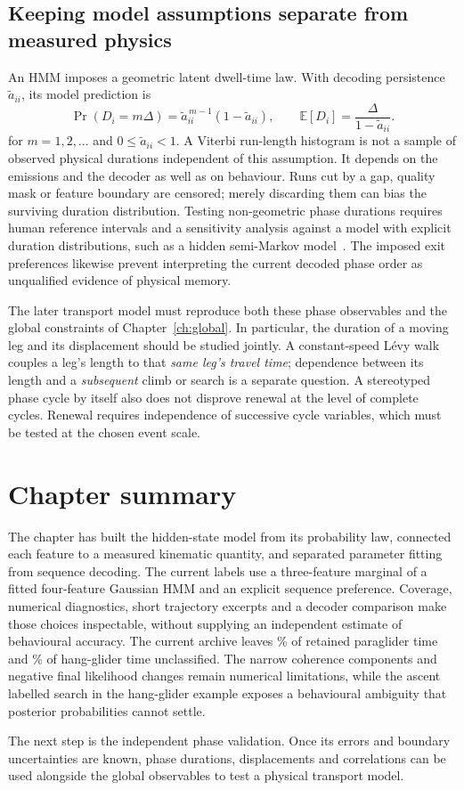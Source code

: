 \subsection{Keeping model assumptions separate from measured physics}
\label{sec:modelling}
An HMM imposes a geometric latent dwell-time law. With decoding persistence
$\widetilde a_{ii}$, its model prediction is
\begin{equation}
 \Pr(D_i=m\Delta)=\widetilde a_{ii}^{\,m-1}(1-\widetilde a_{ii}),\qquad
 \mathbb E[D_i]=\frac{\Delta}{1-\widetilde a_{ii}}.
 \label{eq:hmmsojourn}
\end{equation}
for $m=1,2,\ldots$ and $0\le\widetilde a_{ii}<1$.
A Viterbi run-length histogram is not a sample of observed physical durations independent
of this assumption. It depends on the emissions and the decoder as well as on behaviour.
Runs cut by a gap, quality mask or feature boundary are censored; merely discarding them
can bias the surviving duration distribution. Testing non-geometric phase durations
requires human reference intervals and a sensitivity analysis against a model with
explicit duration distributions, such as a hidden semi-Markov model~\cite{langrock2012}.
The imposed exit preferences likewise prevent interpreting the current decoded phase
order as unqualified evidence of physical memory.

The later transport model must reproduce both these phase observables and the global
constraints of Chapter~\ref{ch:global}. In particular, the duration of a moving leg and
its displacement should be studied jointly. A constant-speed L\'evy walk couples a leg's
length to that \emph{same leg's travel time}; dependence between its length and a
\emph{subsequent} climb or search is a separate question. A stereotyped phase cycle by
itself also does not disprove renewal at the level of complete cycles. Renewal requires
independence of successive cycle variables, which must be tested at the chosen event
scale.

\section{Chapter summary}
\label{sec:tooling}
The chapter has built the hidden-state model from its probability law, connected each
feature to a measured kinematic quantity, and separated parameter fitting from sequence
decoding. The current labels use a three-feature marginal of a fitted four-feature
Gaussian HMM and an explicit sequence preference. Coverage, numerical diagnostics,
short trajectory excerpts and a decoder comparison make those choices inspectable,
without supplying an independent estimate of behavioural accuracy. The current archive
leaves \SegAuditParaExcludedPct\% of retained paraglider time and
\SegAuditHangExcludedPct\% of hang-glider time unclassified. The narrow coherence
components and negative final likelihood changes remain numerical limitations, while
the ascent labelled search in the hang-glider example exposes a behavioural ambiguity
that posterior probabilities cannot settle.

The next step is the independent phase validation. Once its errors and boundary
uncertainties are known, phase durations, displacements and correlations can be used
alongside the global observables to test a physical transport model.
